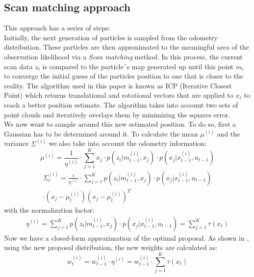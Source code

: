 \documentclass[letterpaper]{article}
\begin{document}
\subsection{Scan matching approach}
This approach has a series of steps:\\
Initially, the next generation of particles is sampled from the odometry distribution. These particles are then approximated to the meaningful area of the observation likelihood via a \textit{Scan matching} method. In this process, the current scan data $z_t$ is compared to the particle´s map generated up until this point $m_i$ to converge the initial guess of the particles position to one that is closer to the reality. The algorithm used in this paper is known as ICP (Iterative Closest Point) which returns translational and rotational vectors that are applied to $x_t$ to reach a better position estimate. The algorithm takes into account two sets of point clouds and iteratively overlays them by minimizing the squares error.\\
We now want to sample around this new estimated position. To do so, first a Gaussian has to be determined around it. To calculate the mean $\mu^{(i)}$ and the variance $\Sigma^{(i)}$ we also take into account the odometry information:
\begin{equation}
\label{mu}
\mu^{(i)}= \frac{1}{\eta^{(i)}}\cdot \sum_{j=1}^K x_j \cdot p(z_t|m_{t-1}^{(i)}, x_j) \cdot p(x_j|x_{t-1}^{(i)}, u_{t-1})
\end{equation} 
\begin{multline}
\label{sigma}
 \Sigma_t^{(i)}= \frac{1}{\eta^{(i)}}\cdot \sum_{j=1}^K p(z_t|m_{t-1}^{(i)}, x_j) \cdot p(x_j|x_{t-1}^{(i)}, u_{t-1}) \\ \cdot (x_j - \mu_t^{(i)})(x_j - \mu_t^{(i)})^T 
\end{multline} 
with the normalization factor:
\begin{multline}
\eta^{(i)}= \sum_{j=1}^K p(z_t|m_{t-1}^{(i)}, x_j) \cdot p(x_j|x_{t-1}^{(i)}, u_{t-1}) =\sum_{j=1}^K \tau (x_t)
\end{multline} 
Now we have a closed-form approximation of the optimal proposal. As shown in \cite{Cyrill}, using the new proposal distribution, the new weights are calculated as:
\begin{equation}
\label{Weights}
w_t^{(i)}=w_{t-1}^{(i)} \cdot \eta^{(i)} = w_{t-1}^{(i)} \cdot \sum_{j=1}^K \tau (x_t)
\end{equation} 
\end{document}
